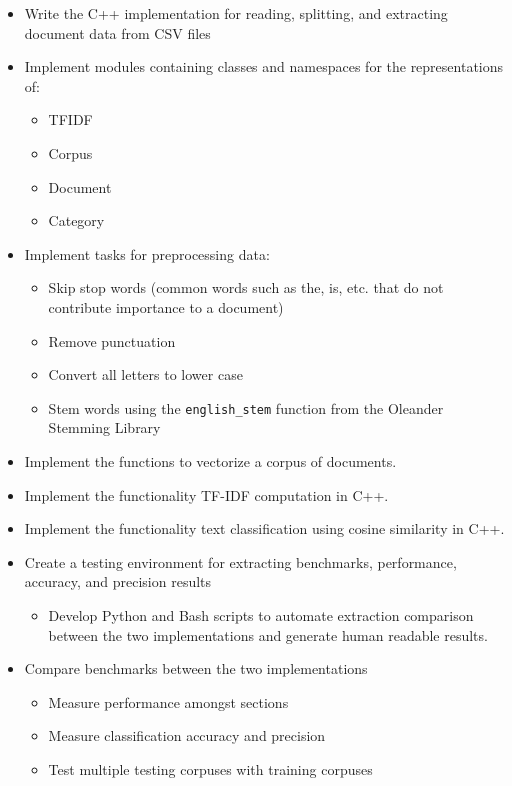 \documentclass[conference]{IEEEtran}
\newcommand{\code}[1]{\lstinline[basicstyle=\ttfamily]|#1|}
\begin{document}
\begin{itemize}
    \item Write the C++ implementation for reading, splitting, and extracting document data from CSV files
    \item Implement modules containing classes and namespaces for the representations of:
    {
        \begin{itemize}    
            \item TFIDF
            \item Corpus
            \item Document
            \item Category
        \end{itemize}
    }
    \item Implement tasks for preprocessing data:
    {
        \begin{itemize}    
            \item Skip stop words (common words such as the, is, etc. that do not contribute importance to a document)
            \item Remove punctuation
            \item Convert all letters to lower case
            \item Stem words using the \code{english_stem} function from the Oleander Stemming Library~\cite{b5}
        \end{itemize}
    }
    \item Implement the functions to vectorize a corpus of documents.
    \item Implement the functionality TF-IDF computation in C++.
    \item Implement the functionality text classification using cosine similarity in C++.
    \item Create a testing environment for extracting benchmarks, performance, accuracy, and precision results
    {
        \begin{itemize}    
            \item Develop Python and Bash scripts to automate extraction comparison between the two implementations and generate human readable results.
        \end{itemize}
    }
    \item Compare benchmarks between the two implementations
    {
        \begin{itemize}    
            \item Measure performance amongst sections
            \item Measure classification accuracy and precision
            \item Test multiple testing corpuses with training corpuses
        \end{itemize}
    }
\end{itemize}
\end{document}
